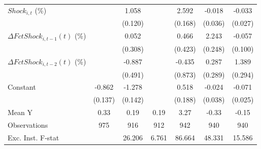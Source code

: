 {\begin{tabular}{l*{6}{c}}
\addlinespace
$ Shock_{i,t}$ (\%) &                     &       1.058\sym{***}&                     &       2.592\sym{***}&      -0.018         &      -0.033         \\
                    &                     &     (0.120)         &                     &     (0.168)         &     (0.036)         &     (0.027)         \\
\addlinespace
$ \Delta FctShock_{i,t-1}(t)$ (\%)&                     &       0.052         &                     &       0.466         &       2.243\sym{***}&      -0.057         \\
                    &                     &     (0.308)         &                     &     (0.423)         &     (0.248)         &     (0.100)         \\
\addlinespace
$ \Delta FctShock_{i,t-2}(t)$ (\%)&                     &      -0.887\sym{*}  &                     &      -0.435         &       0.287         &       1.389\sym{***}\\
                    &                     &     (0.491)         &                     &     (0.873)         &     (0.289)         &     (0.294)         \\
\addlinespace
Constant            &      -0.862\sym{***}&      -1.278\sym{***}&                     &       0.518\sym{***}&      -0.024         &      -0.071\sym{***}\\
                    &     (0.137)         &     (0.142)         &                     &     (0.188)         &     (0.038)         &     (0.025)         \\
\midrule
Mean Y              &        0.33         &        0.19         &        0.19         &        3.27         &       -0.33         &       -0.15         \\
Observations        &         975         &         916         &         912         &         942         &         940         &         940         \\
Exc. Inst. F-stat   &                     &      26.206         &       6.761         &      86.664         &      48.331         &      15.586         \\
\bottomrule
\end{tabular}
}
